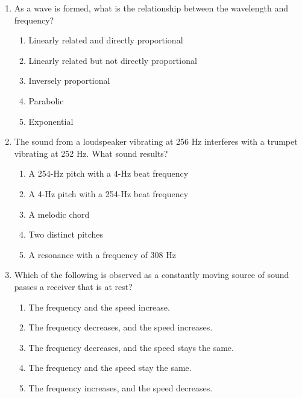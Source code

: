 \documentclass{../../../oss-apphys}
\begin{document}
\begin{multicols}{2}
\begin{enumerate}[leftmargin=18pt,resume]
  \item As a wave is formed, what is the relationship between the wavelength
    and frequency?
    \begin{enumerate}[noitemsep,topsep=0pt,leftmargin=18pt,label=(\Alph*)]
    \item Linearly related and directly proportional
    \item Linearly related but not directly proportional
    \item Inversely proportional
    \item Parabolic
    \item Exponential
    \end{enumerate}
    
  \item The sound from a loudspeaker vibrating at 256 Hz interferes with a
    trumpet vibrating at 252 Hz. What sound results?
    \begin{enumerate}[noitemsep,topsep=0pt,leftmargin=18pt,label=(\Alph*)]
    \item A 254-Hz pitch with a 4-Hz beat frequency
    \item A 4-Hz pitch with a 254-Hz beat frequency
    \item A melodic chord
    \item Two distinct pitches
    \item A resonance with a frequency of 308 Hz
    \end{enumerate}
    

  \item Which of the following is observed as a constantly moving source of
    sound passes a receiver that is at rest?
    \begin{enumerate}[noitemsep,topsep=0pt,leftmargin=18pt,label=(\Alph*)]
    \item The frequency and the speed increase.
    \item The frequency decreases, and the speed increases.
    \item The frequency decreases, and the speed stays the same.
    \item The frequency and the speed stay the same.
    \item The frequency increases, and the speed decreases.
    \end{enumerate}


\end{enumerate}
\end{multicols}
\end{document}
